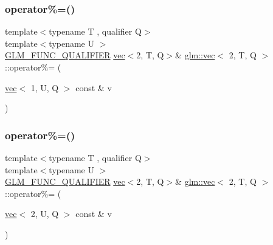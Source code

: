 \mbox{\label{structglm_1_1vec_3_012_00_01_t_00_01_q_01_4_a267102cc597898b31585143684c70530}} 
\subsubsection{\texorpdfstring{operator\%=()}{operator\%=()}\hspace{0.1cm}{\footnotesize\ttfamily [5/6]}}
{\footnotesize\ttfamily template$<$typename T , qualifier Q$>$ \\
template$<$typename U $>$ \\
\hyperlink{setup_8hpp_a33fdea6f91c5f834105f7415e2a64407}{G\+L\+M\+\_\+\+F\+U\+N\+C\+\_\+\+Q\+U\+A\+L\+I\+F\+I\+ER} \hyperlink{structglm_1_1vec}{vec}$<$2, T, Q$>$\& \hyperlink{structglm_1_1vec}{glm\+::vec}$<$ 2, T, Q $>$\+::operator\%= (\begin{DoxyParamCaption}\item[{\hyperlink{structglm_1_1vec}{vec}$<$ 1, U, Q $>$ const \&}]{v }\end{DoxyParamCaption})}

\mbox{\label{structglm_1_1vec_3_012_00_01_t_00_01_q_01_4_a28092b816bf44c13025e22c1cdf53d68}} 
\subsubsection{\texorpdfstring{operator\%=()}{operator\%=()}\hspace{0.1cm}{\footnotesize\ttfamily [6/6]}}
{\footnotesize\ttfamily template$<$typename T , qualifier Q$>$ \\
template$<$typename U $>$ \\
\hyperlink{setup_8hpp_a33fdea6f91c5f834105f7415e2a64407}{G\+L\+M\+\_\+\+F\+U\+N\+C\+\_\+\+Q\+U\+A\+L\+I\+F\+I\+ER} \hyperlink{structglm_1_1vec}{vec}$<$2, T, Q$>$\& \hyperlink{structglm_1_1vec}{glm\+::vec}$<$ 2, T, Q $>$\+::operator\%= (\begin{DoxyParamCaption}\item[{\hyperlink{structglm_1_1vec}{vec}$<$ 2, U, Q $>$ const \&}]{v }\end{DoxyParamCaption})}

